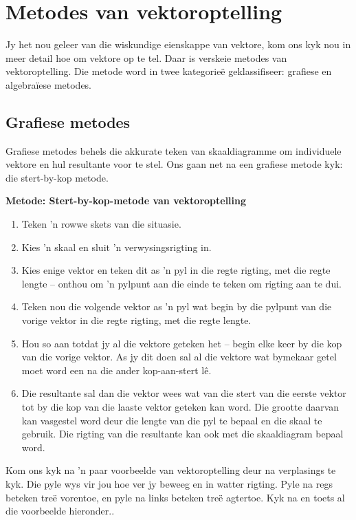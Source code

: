 \section{Metodes van vektoroptelling}

Jy het nou geleer van die wiskundige eienskappe van vektore, kom ons kyk nou in meer detail hoe om vektore op te tel. Daar is verskeie metodes van vektoroptelling. Die metode word in twee kategorieë geklassifiseer: grafiese en algebraïese metodes.

\subsection*{Grafiese metodes}
Grafiese metodes behels die akkurate teken van skaaldiagramme om individuele vektore en hul resultante voor te stel. Ons gaan net na een grafiese metode kyk: die stert-by-kop metode.

\textbf{Metode: Stert-by-kop-metode van vektoroptelling}
\begin{enumerate}[noitemsep, label=\textbf{\arabic*}.]
\item{Teken  'n rowwe skets van die situasie.}
\item{Kies  'n skaal en sluit  'n verwysingsrigting in.}
\item{Kies enige vektor en teken dit as  'n pyl in die regte rigting, met die regte lengte -- onthou om  'n pylpunt aan die einde te teken om rigting aan te dui.}
\item{Teken nou die volgende vektor as  'n pyl wat begin by die pylpunt van die vorige vektor in die regte rigting, met die regte lengte.}
\item{Hou so aan totdat jy al die vektore geteken het -- begin elke keer by die kop van die vorige vektor. As jy dit doen sal al die vektore wat bymekaar getel moet word een na die ander kop-aan-stert l\^{e}.}
\item{Die resultante sal dan die vektor wees wat van die stert van die eerste vektor tot by die kop van die laaste vektor geteken kan word. Die grootte daarvan kan vasgestel word deur die lengte van die pyl te bepaal en die skaal te gebruik. Die rigting van die resultante kan ook met die skaaldiagram bepaal word. }
\end{enumerate} \par


Kom ons kyk na  'n paar voorbeelde van vektoroptelling deur na verplasings te kyk. Die pyle wys vir jou hoe ver jy beweeg en in watter rigting. Pyle na regs beteken treë vorentoe, en pyle na links beteken treë agtertoe. Kyk na en toets al die voorbeelde hieronder..\par 

